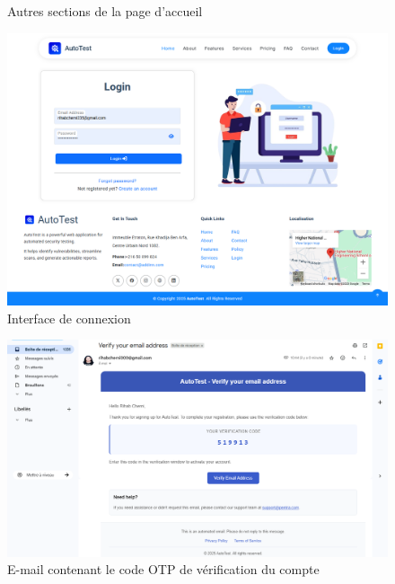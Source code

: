 \begin{justify}
\begin{enumerate}[label=\Alph*.]
\begin{figure}[H]
                    \caption{\centering Autres sections de la page d’accueil}
                    \label{fig:accueil2}
                \end{figure}
                \vspace{-0.3cm}
                \begin{figure}[H]
                    \centering
                    \includegraphics[width=0.95\linewidth]{chapitres/ch3Sp1/section/sprint1/img/interface/login.png}
                    \caption{Interface de connexion}
                    \label{fig:login}
                \end{figure}
                \vspace{-0.3cm}
                \begin{figure}[H]
                    \centering
                    \includegraphics[width=\linewidth]{chapitres/ch3Sp1/section/sprint1/img/interface/email-verif.PNG}
                    \caption{\centering E-mail contenant le code OTP de vérification du compte}

\end{figure}
\end{enumerate}
\end{justify}
